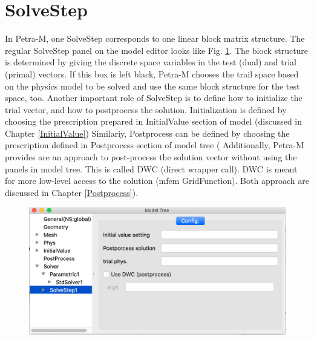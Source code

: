 \documentclass[11pt,a4paper,final]{report}
\begin{document}
\section{SolveStep}
In Petra-M, one SolveStep corresponds to one linear block matrix structure. 
The regular SolveStep panel on the model editor looks like Fig. \ref{solve_step}.
The block structure is determined by giving the discrete space variables in the test (dual) and trial  (primal) vectors. 
If this box is left black, Petra-M chooses the trail space based on the physics model to be solved and use the same block structure for the test space, too.
Another important role of SolveStep is to define how to initialize the trial vector, and how to postprocess the solution.
Initialization is defined by choosing the prescription prepared in InitialValue section of model (discussed in Chapter \ref{InitialValue})
Similariy, Postprocess can be defined by choosing the prescription defined in Postprocess section of model tree (
Additionally, Petra-M provides are an approach to post-process the solution vector without using the panels in model tree. This is called DWC (direct wrapper call).
DWC is meant for more low-level access to the solution (mfem GridFunction). 
Both approach are discussed in Chapter \ref{Postprocess}). 

\begin{figure}
\centering
\includegraphics[width=0.95\columnwidth]{figures/solve_step.png} 
\caption{  }\label{solve_step}
\end{figure}
\end{document}
